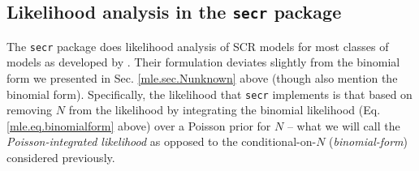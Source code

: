 \begin{comment}
As an
exercise, run this analysis for 30 and 40 km buffers and compare those
found in section 4.6 under {\bf WinBUGS}.  
NOTE: The function \mbox{\tt
  secr.fit} 
will return a
warning when the buffer size appears to be too small.  This is useful
particularly with the different units being used between programs and
packages.
\end{comment}

\subsection{Likelihood analysis in the \mbox{\tt secr} package}
\label{mle.sec.secrguts}

The \mbox{\tt secr} package does likelihood analysis of SCR models for
most classes of models as developed by
\citet{borchers_efford:2008}. Their formulation deviates slightly from
the binomial form we presented in Sec.  \ref{mle.sec.Nunknown} above
(though \citet{borchers_efford:2008} also mention the binomial form).
Specifically, the likelihood that \mbox{\tt secr} implements is that
based on removing $N$ from the likelihood by integrating the binomial
likelihood (Eq.  \ref{mle.eq.binomialform} above) over a Poisson prior
for $N$ -- what we will call the {\it Poisson-integrated likelihood} as
opposed to the conditional-on-$N$ ({\it binomial-form}) considered
previously.

